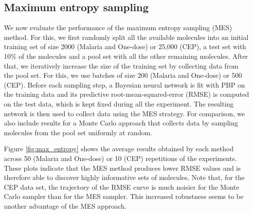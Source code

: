 \subsection{Maximum entropy sampling}

We now evaluate the performance of the maximum entropy sampling (MES) method. For this, we first randomly split all the available molecules into an initial training set of size 2000 (Malaria and One-dose) or 25,000 (CEP), a test set with 10\% of the molecules and a pool set with all the other remaining molecules. After that, we iteratively increase the size of the training set by collecting data from the pool set. For this, we use batches of size 200 (Malaria and One-dose) or 500 (CEP). Before each sampling step, a Bayesian neural network is fit with PBP on the training data and its predictive root-mean-squared-error (RMSE) is computed on the test data, which is kept fixed during all the experiment. The resulting network is then used to collect data using the MES strategy. For comparison, we also include results for a Monte Carlo approach that collects data by sampling molecules from the pool set uniformly at random.

Figure \ref{fig:max_entropy} shows the average results obtained by each method across 50 (Malaria and One-dose) or 10 (CEP) repetitions of the experiments. These plots indicate that the MES method produces lower RMSE values and is therefore able to discover highly informative sets of molecules. Note that, for the CEP data set, the trajectory of the RMSE curve is much noisier for the Monte Carlo sampler than for the MES sampler. This increased robustness seems to be another advantage of the MES approach.
